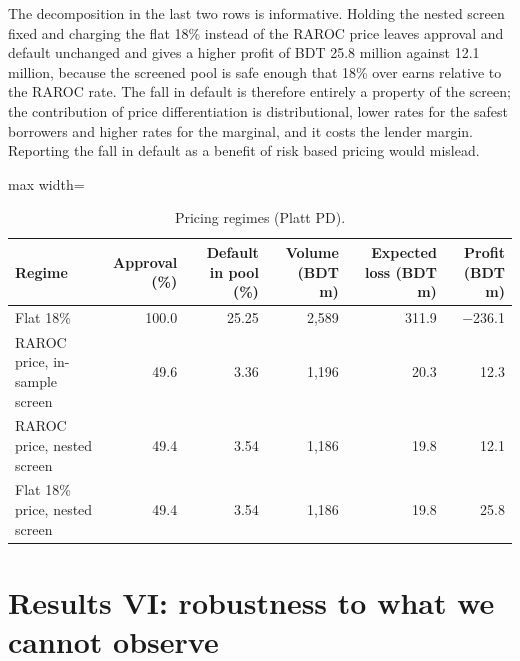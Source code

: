 \documentclass[11pt,a4paper]{article}
\newcommand{\tabsize}{\footnotesize}
\begin{document}
The decomposition in the last two rows is informative. Holding the nested screen fixed and charging the flat 18\% instead of the RAROC price leaves approval and default unchanged and gives a higher profit of BDT 25.8 million against 12.1 million, because the screened pool is safe enough that 18\% over earns relative to the RAROC rate. The fall in default is therefore entirely a property of the screen; the contribution of price differentiation is distributional, lower rates for the safest borrowers and higher rates for the marginal, and it costs the lender margin. Reporting the fall in default as a benefit of risk based pricing would mislead.
\begin{table}[H]\centering\tabsize\setlength{\tabcolsep}{3pt}\caption{Pricing regimes (Platt PD).}\label{tab:regime}
\begin{adjustbox}{max width=\textwidth}
\begin{tabular}{lrrrrr}
\toprule
Regime & Approval (\%) & Default in pool (\%) & Volume (BDT m) & Expected loss (BDT m) & Profit (BDT m) \\
\midrule
Flat 18\% & 100.0 & 25.25 & 2,589 & 311.9 & $-$236.1 \\
RAROC price, in-sample screen & 49.6 & 3.36 & 1,196 & 20.3 & 12.3 \\
RAROC price, nested screen & 49.4 & 3.54 & 1,186 & 19.8 & 12.1 \\
Flat 18\% price, nested screen & 49.4 & 3.54 & 1,186 & 19.8 & 25.8 \\
\bottomrule
\end{tabular}
\end{adjustbox}\end{table}

\section{Results VI: robustness to what we cannot observe}\label{sec:robust}
\end{document}

